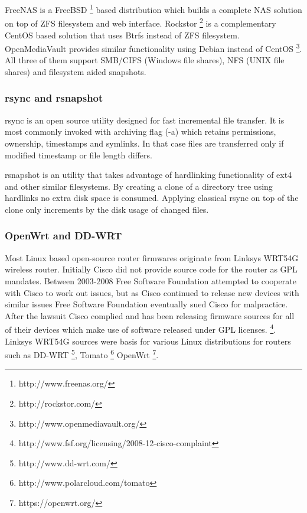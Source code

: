 \documentclass{article}
\begin{document}
FreeNAS is a FreeBSD \footnote{http://www.freenas.org/}
based distribution which builds a complete NAS solution on top of
ZFS filesystem and web interface.
Rockstor \footnote{http://rockstor.com/}
is a complementary CentOS based solution that uses Btrfs instead
of ZFS filesystem.
OpenMediaVault provides similar functionality using Debian instead of CentOS
\footnote{http://www.openmediavault.org/}.
All three of them support SMB/CIFS (Windows file shares),
NFS (UNIX file shares) and filesystem aided snapshots.





\subsubsection{rsync and rsnapshot}

rsync is an open source utility designed for
fast incremental file transfer.
It is most commonly invoked with archiving flag (-a) which
retains permissions, ownership, timestamps and symlinks.
In that case files are transferred only if
modified timestamp or file length differs.

rsnapshot is an utility that takes advantage of hardlinking
functionality of ext4 and other similar filesystems.
By creating a clone of a directory tree using hardlinks no
extra disk space is consumed. Applying classical rsync on top of
the clone only increments by the disk usage of changed files.


\subsubsection{OpenWrt and DD-WRT}

Most Linux based open-source router firmwares originate from
Linksys WRT54G wireless router.
Initially Cisco did not provide source code for the router as GPL mandates.
Between 2003-2008 Free Software Foundation attempted to cooperate
with Cisco to work out issues, but as Cisco continued to release
new devices with similar issues Free Software Foundation eventually
sued Cisco for malpractice.
After the lawsuit Cisco complied and has been releasing firmware
sources for all of their devices which make use of software
released under GPL licenses.
\footnote{http://www.fsf.org/licensing/2008-12-cisco-complaint}.
Linksys WRT54G sources were basis for various Linux distributions for routers such as
DD-WRT \footnote{http://www.dd-wrt.com/},
Tomato \footnote{http://www.polarcloud.com/tomato}
OpenWrt \footnote{https://openwrt.org/}.
\end{document}
